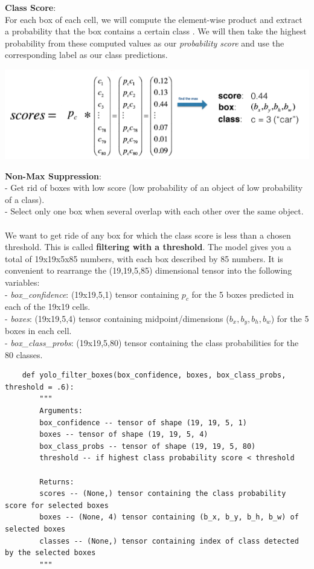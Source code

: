 \documentclass[11pt, a4paper]{article}
\begin{document}
\begin{spacing}{1.1}
	\noindent \textbf{Class Score}: \\
	For each box of each cell, we will compute the element-wise product and extract a probability that the box contains a certain class	. We will then take the highest probability from these computed values as our \textit{probability score} and use the corresponding label as our class predictions.
	\begin{center}	\includegraphics[scale=.7]{class_score} \end{center}
	\textbf{Non-Max Suppression}:\\
	- Get rid of boxes with low score (low probability of an object of low probability of a class).\\
	- Select only one box when several overlap with each other over the same object. \\~\\
	We want to get ride of any box for which the class score is less than a chosen threshold. This is called \textbf{filtering with a threshold}. The model gives you a total of 19x19x5x85 numbers, with each box described by 85 numbers. It is convenient to rearrange the (19,19,5,85) dimensional tensor into the following variables: \vspace*{1mm}\\
	- \textit{box\_confidence}: (19x19,5,1) tensor containing $p_c$ for the 5 boxes predicted in each of the 19x19 cells.\\
	- \textit{boxes}: (19x19,5,4) tensor containing midpoint/dimensions ($b_x, b_y, b_h, b_w$) for the 5 boxes in each cell.\\
	- \textit{box\_class\_probs}: (19x19,5,80) tensor containing the class probabilities for the 80 classes.
	\begin{lstlisting}
	def yolo_filter_boxes(box_confidence, boxes, box_class_probs, threshold = .6):
		"""
		Arguments:
		box_confidence -- tensor of shape (19, 19, 5, 1)
		boxes -- tensor of shape (19, 19, 5, 4)
		box_class_probs -- tensor of shape (19, 19, 5, 80)
		threshold -- if highest class probability score < threshold
		
		Returns:
		scores -- (None,) tensor containing the class probability score for selected boxes
		boxes -- (None, 4) tensor containing (b_x, b_y, b_h, b_w) of selected boxes
		classes -- (None,) tensor containing index of class detected by the selected boxes
		"""
		

\end{lstlisting}
\end{spacing}
\end{document}

